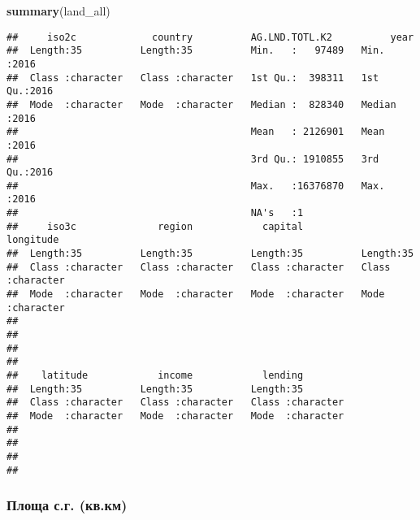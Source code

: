 \documentclass[
]{article}
\newenvironment{Shaded}{\begin{snugshade}}{\end{snugshade}}
\newcommand{\KeywordTok}[1]{\textcolor[rgb]{0.13,0.29,0.53}{\textbf{#1}}}
\newcommand{\NormalTok}[1]{#1}
\begin{document}
\begin{Shaded}
\begin{Highlighting}[]
\KeywordTok{summary}\NormalTok{(land_all)}
\end{Highlighting}
\end{Shaded}

\begin{verbatim}
##     iso2c             country          AG.LND.TOTL.K2          year     
##  Length:35          Length:35          Min.   :   97489   Min.   :2016  
##  Class :character   Class :character   1st Qu.:  398311   1st Qu.:2016  
##  Mode  :character   Mode  :character   Median :  828340   Median :2016  
##                                        Mean   : 2126901   Mean   :2016  
##                                        3rd Qu.: 1910855   3rd Qu.:2016  
##                                        Max.   :16376870   Max.   :2016  
##                                        NA's   :1                        
##     iso3c              region            capital           longitude        
##  Length:35          Length:35          Length:35          Length:35         
##  Class :character   Class :character   Class :character   Class :character  
##  Mode  :character   Mode  :character   Mode  :character   Mode  :character  
##                                                                             
##                                                                             
##                                                                             
##                                                                             
##    latitude            income            lending         
##  Length:35          Length:35          Length:35         
##  Class :character   Class :character   Class :character  
##  Mode  :character   Mode  :character   Mode  :character  
##                                                          
##                                                          
##                                                          
## 
\end{verbatim}

\hypertarget{ux43fux43bux43eux449ux430-ux441.ux433.-ux43aux432.ux43aux43c}{%
\subsubsection{Площа с.г.
(кв.км)}\label{ux43fux43bux43eux449ux430-ux441.ux433.-ux43aux432.ux43aux43c}}
\end{document}
